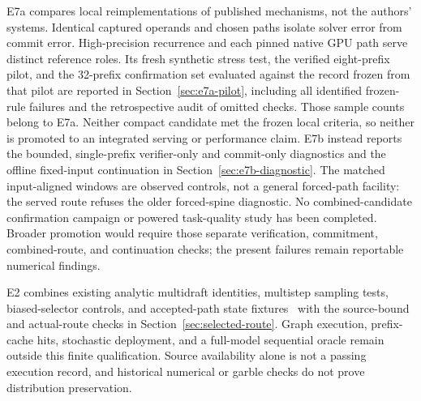 \documentclass[conference]{IEEEtran}
\begin{document}
E7a compares local reimplementations of published mechanisms, not the authors' systems. Identical captured operands and chosen paths isolate solver error from commit error. High-precision recurrence and each pinned native GPU path serve distinct reference roles. Its fresh synthetic stress test, the verified eight-prefix pilot, and the 32-prefix confirmation set evaluated against the record frozen from that pilot are reported in Section~\ref{sec:e7a-pilot}, including all identified frozen-rule failures and the retrospective audit of omitted checks. Those sample counts belong to E7a. Neither compact candidate met the frozen local criteria, so neither is promoted to an integrated serving or performance claim. E7b instead reports the bounded, single-prefix verifier-only and commit-only diagnostics and the offline fixed-input continuation in Section~\ref{sec:e7b-diagnostic}. The matched input-aligned windows are observed controls, not a general forced-path facility: the served route refuses the older forced-spine diagnostic. No combined-candidate confirmation campaign or powered task-quality study has been completed. Broader promotion would require those separate verification, commitment, combined-route, and continuation checks; the present failures remain reportable numerical findings.

E2 combines existing analytic multidraft identities, multistep sampling tests, biased-selector controls, and accepted-path state fixtures~\cite{lumo2026archive} with the source-bound and actual-route checks in Section~\ref{sec:selected-route}. Graph execution, prefix-cache hits, stochastic deployment, and a full-model sequential oracle remain outside this finite qualification. Source availability alone is not a passing execution record, and historical numerical or garble checks do not prove distribution preservation.

\label{ReferencesStart}


\end{document}
